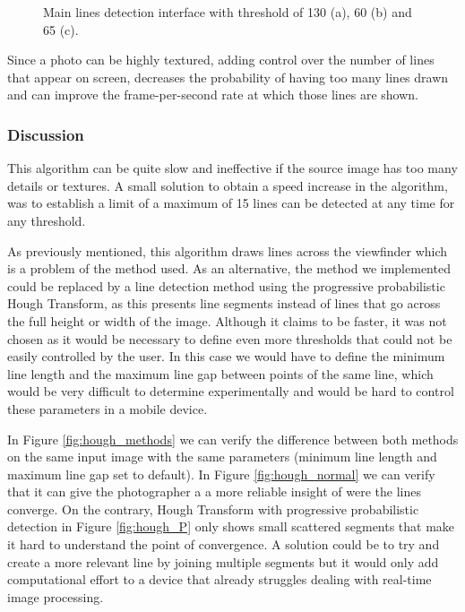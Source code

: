 \begin{figure}[htbp]
	\centering
	\begin{minipage}[b]{\textwidth}
  		\centering
  	\end{minipage}
  	\caption{Main lines detection interface with threshold of 130 (a), 60 (b) and 65 (c).}    				\label{fig:mainline_interface}
\end{figure}

Since a photo can be highly textured, adding control over the number of lines that appear on screen, decreases the probability of having too many lines drawn and can improve the frame-per-second rate at which those lines are shown.

\subsubsection{Discussion}

This algorithm can be quite slow and ineffective if the source image has too many details or textures. A small solution to obtain a speed increase in the algorithm, was to establish a limit of a maximum of 15 lines can be detected at any time for any threshold.

As previously mentioned, this algorithm draws lines across the viewfinder which is a problem of the method used. As an alternative, the method we implemented could be replaced by a line detection method using the progressive probabilistic Hough Transform\cite{matas2000robust}, as this presents line segments instead of lines that go across the full height or width of the image. Although it claims to be faster, it was not chosen as it would be necessary to define even more thresholds that could not be easily controlled by the user. In this case we would have to define the minimum line length and the maximum line gap between points of the same line, which would be very difficult to determine experimentally and would be hard to control these parameters in a mobile device.

In Figure \ref{fig:hough_methods} we can verify the difference between both methods on the same input image with the same parameters (minimum line length and maximum line gap set to default). In Figure \ref{fig:hough_normal} we can verify that it can give the photographer a a more reliable insight of were the lines converge. On the contrary, Hough Transform with progressive probabilistic detection in Figure \ref{fig:hough_P} only shows small scattered segments that make it hard to understand the point of convergence. A solution could be to try and create a more relevant line by joining multiple segments but it would only add computational effort to a device that already struggles dealing with real-time image processing.

